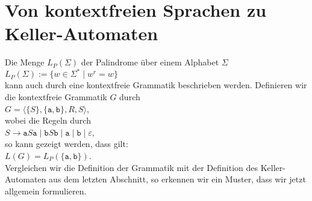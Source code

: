 \section{Von  kontextfreien Sprachen zu Keller-Automaten}
Die Menge $L_P(\Sigma)$ der Palindrome \"uber einem Alphabet $\Sigma$
\\[0.2cm]
\hspace*{1.3cm}
$L_P(\Sigma) := \bigl\{ w \in \Sigma^* \mid w^r = w \bigr\}$
\\[0.2cm]
kann auch durch eine kontextfreie Grammatik beschrieben werden.  Definieren wir die
kontextfreie Grammatik $G$ durch
\\[0.2cm]
\hspace*{1.3cm}
$G = \langle \bigl\{S\}, \{ \texttt{a},\texttt{b}\}, R, S\bigr\rangle$,
\\[0.2cm]
wobei die Regeln durch
\\[0.2cm]
\hspace*{1.3cm}
$S \rightarrow \texttt{a}S\texttt{a} \mid \texttt{b}S\texttt{b} \mid \texttt{a} \mid \texttt{b} \mid \varepsilon$,
\\[0.2cm]
so kann gezeigt werden, dass gilt:
\\[0.2cm]
\hspace*{1.3cm}
$L(G) = L_P(\{\texttt{a},\texttt{b}\})$.
\\[0.2cm]
Vergleichen wir die Definition der Grammatik mit der Definition des Keller-Automaten aus
dem letzten Abschnitt, so erkennen wir ein Muster, dass wir jetzt allgemein formulieren.

